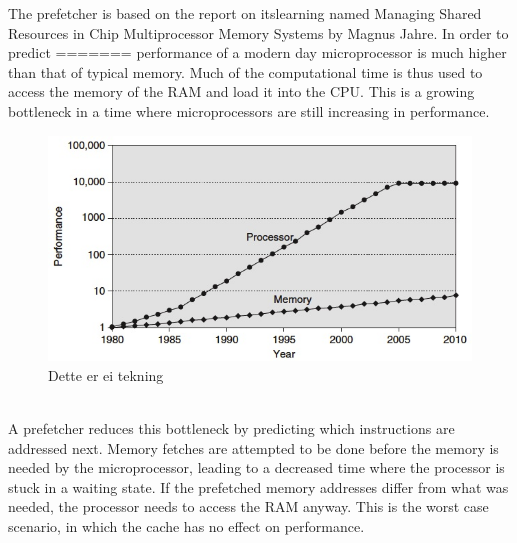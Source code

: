The prefetcher is based on the report on itslearning named Managing Shared Resources in Chip Multiprocessor Memory Systems by Magnus Jahre. In order to predict
=======
 performance of a modern day microprocessor is much higher than that of typical memory. Much of the computational time is thus used to access the memory of the RAM and load it into the CPU. This is a growing bottleneck in a time where microprocessors are still increasing in performance. 
\\
\begin{figure}[h!]
	\includegraphics[scale = 0.5]{graphics/CPUmemoryGap.jpg}
	\caption{Dette er ei tekning}
\end{figure}
\\
A prefetcher reduces this bottleneck by predicting which instructions are addressed next. Memory fetches are attempted to be done before the memory is needed by the microprocessor, leading to a decreased time where the processor is stuck in a waiting state. If the prefetched memory addresses differ from what was needed, the processor needs to access the RAM anyway. This is the worst case scenario, in which the cache has no effect on performance.